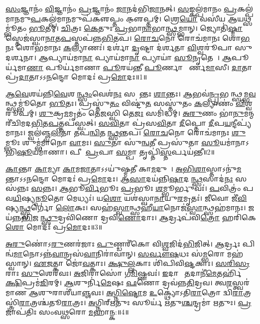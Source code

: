 \setcounter{anuvakam}{0}

   \ul{𑌸𑌂}𑌜𑍍𑌞𑌾𑌨𑌂॑ \ul{𑌵𑌿}𑌜𑍍𑌞𑌾𑌨𑌂॑ \ul{𑌪𑍍𑌰}𑌜𑍍𑌞𑌾𑌨𑌂॑ \ul{𑌜𑌾}𑌨𑌦॑𑌭𑌿\ul{𑌜𑌾}𑌨𑌤𑍍।
   \ul{𑌸}𑌙𑍍𑌕𑌲𑍍𑌪॑𑌮𑌾𑌨𑌂 \ul{𑌪𑍍𑌰}𑌕𑌲𑍍𑌪॑𑌮𑌾𑌨𑌮𑍁\ul{𑌪}\-𑌕𑌲𑍍𑌪॑𑌮𑌾\ul{𑌨}𑌮𑍁𑌪॑𑌕𑍢𑌪𑍍𑌤𑌂 𑌕𑍢॒𑌪𑍍𑌤𑌮𑍍।
   𑌶𑍍𑌰𑍇\ul{𑌯𑍋} 𑌵𑌸𑍀॑𑌯 \ul{𑌆}𑌯𑌥𑍍𑌸𑌮𑍍𑌭𑍂॑𑌤𑌂 \ul{𑌭𑍂}𑌤𑌮𑍍।
   \ul{𑌚𑌿}𑌤𑍍𑌰𑌃 \ul{𑌕𑍇}𑌤𑍁𑌃 \ul{𑌪𑍍𑌰}𑌭𑌾\ul{𑌨𑌾}𑌭𑌾\ul{𑌨𑍍𑌥𑍍𑌸}𑌮𑍍𑌭𑌾𑌨𑍍।
   𑌜𑍍𑌯𑍋𑌤𑌿॑\ul{𑌷𑍍𑌮𑌾}\ul{}𑌸𑍍𑌤𑍇𑌜॑𑌸𑍍𑌵𑌾\ul{𑌨𑌾}𑌤\ul{𑌪}\ul{}𑌸𑍍𑌤𑌪॑𑌨𑍍𑌨\ul{𑌭𑌿}\-𑌤𑌪\sn{}।
   \ul{𑌰𑍋}\ul{𑌚}𑌨𑍋 𑌰𑍋𑌚॑𑌮𑌾𑌨𑌃 𑌶𑍋\ul{𑌭}𑌨𑌃 𑌶𑍋𑌭॑𑌮𑌾𑌨𑌃 \ul{𑌕}𑌲𑍍𑌯𑌾𑌣𑌃॑।
   𑌦𑌰𑍍\mbox{}𑌶𑌾॑ \ul{𑌦𑍃}𑌷𑍍𑌟𑌾 𑌦॑𑌰𑍍\mbox{}\ul{𑌶}𑌤𑌾 \ul{𑌵𑌿}𑌶𑍍𑌵𑌰𑍂॑𑌪𑌾 𑌸𑍁𑌦𑌰𑍍\mbox{}\ul{𑌶}𑌨𑌾।
   \ul{𑌆}𑌪𑍍𑌯𑌾𑌯॑𑌮𑌾\ul{𑌨𑌾} 𑌪𑍍𑌯𑌾𑌯॑𑌮𑌾\ul{𑌨𑌾} 𑌪𑍍𑌯𑌾𑌯𑌾॑ \ul{𑌸𑍂}𑌨𑍃𑌤𑍇𑌰𑌾᳚।
   \ul{𑌆}𑌪𑍂𑌰𑍍𑌯॑𑌮𑌾\ul{𑌣𑌾} 𑌪𑍂𑌰𑍍𑌯॑𑌮𑌾𑌣𑌾 \ul{𑌪𑍂}𑌰𑌯॑𑌨𑍍𑌤𑍀 \ul{𑌪𑍂}𑌰𑍍𑌣𑌾 𑌪𑍗᳚𑌰𑍍𑌣\ul{𑌮𑌾}𑌸𑍀।
   \ul{𑌦𑌾}𑌤𑌾 𑌪𑍍𑌰॑\ul{𑌦𑌾}𑌤𑌾𑌽𑌽\ul{𑌨}𑌨𑍍𑌦𑍋 𑌮𑍋𑌦𑌃॑ 𑌪𑍍𑌰\ul{𑌮𑍋}𑌦𑌃॥1॥

   \ul{𑌆}\ul{𑌵𑍇}𑌶𑌯॑𑌨𑍍𑌨𑌿\ul{𑌵𑍇}𑌶𑌯᳚\ul{𑌨𑍍𑌥𑍍𑌸𑌂}𑌵𑍇𑌶॑\ul{𑌨𑌃} 𑌸𑌶𑌾᳚𑌨𑍍𑌤𑌃 \ul{𑌶𑌾}𑌨𑍍𑌤𑌃।
   \ul{𑌆}𑌭𑌵॑\ul{𑌨𑍍𑌪𑍍𑌰}\-𑌭𑌵᳚𑌨𑍍𑌥𑍍\-\ul{𑌸}𑌮𑍍𑌭\ul{𑌵}𑌨𑍍𑌥𑍍𑌸𑌮𑍍𑌭𑍂॑𑌤𑍋 \ul{𑌭𑍂}𑌤𑌃।
   𑌪𑍍𑌰𑌸𑍍𑌤𑍁॑\ul{𑌤𑌂} 𑌵𑌿𑌷𑍍𑌟𑍁॑\ul{𑌤}\ul{} 𑌸𑌸𑍍𑌤𑍁॑𑌤𑌂 \ul{𑌕}𑌲𑍍𑌯𑌾𑌣𑌂॑ \ul{𑌵𑌿}𑌶𑍍𑌵𑌰𑍂॑𑌪𑌮𑍍।
   \ul{𑌶𑍁}𑌕𑍍𑌰\ul{𑌮}𑌮𑍃𑌤𑌂॑ 𑌤𑍇\ul{𑌜}𑌸𑍍𑌵𑌿 𑌤𑍇\ul{𑌜𑌃} 𑌸𑌮𑌿॑𑌦𑍍𑌧𑌮𑍍।
   \ul{𑌅}\ul{𑌰𑍁}𑌣𑌂 𑌭𑌾॑\ul{𑌨𑍁}𑌮𑌨𑍍𑌮𑌰𑍀॑𑌚𑌿𑌮𑌦\ul{𑌭𑌿}𑌤\ul{𑌪}𑌤𑍍𑌤𑌪॑𑌸𑍍𑌵𑌤𑍍।
   \ul{𑌸}\ul{𑌵𑌿}𑌤𑌾 𑌪𑍍𑌰॑𑌸\ul{𑌵𑌿}𑌤𑌾 \ul{𑌦𑍀}𑌪𑍍𑌤𑍋 \ul{𑌦𑍀}𑌪\ul{𑌯}𑌨𑍍𑌦𑍀𑌪𑍍𑌯॑𑌮𑌾𑌨𑌃।
   𑌜𑍍𑌵𑌲॑𑌞𑍍𑌜𑍍𑌵\ul{𑌲𑌿}𑌤𑌾 𑌤𑌪॑\ul{𑌨𑍍𑌵𑌿}𑌤𑌪᳚\ul{𑌨𑍍𑌥𑍍𑌸}𑌨𑍍𑌤𑌪\sn{}।
   \ul{𑌰𑍋}\ul{𑌚}𑌨𑍋 𑌰𑍋𑌚॑𑌮𑌾𑌨𑌃 \ul{𑌶𑍁}𑌮𑍍𑌭𑍂𑌃 𑌶𑍁𑌮𑍍𑌭॑𑌮𑌾𑌨𑍋 \ul{𑌵𑌾}𑌮𑌃।
   \ul{𑌸𑍁}𑌤𑌾 𑌸𑍁॑\ul{𑌨𑍍𑌵}𑌤𑍀 𑌪𑍍𑌰𑌸𑍁॑𑌤𑌾 \ul{𑌸𑍂}𑌯𑌮𑌾॑𑌨𑌾𑌽𑌭𑌿\ul{𑌷𑍂}𑌯𑌮𑌾॑𑌣𑌾।
   𑌪𑍀𑌤𑍀᳚ \ul{𑌪𑍍𑌰}𑌪𑌾 \ul{𑌸}𑌮𑍍𑌪𑌾 𑌤𑍃𑌪𑍍𑌤𑌿॑\ul{𑌸𑍍𑌤}𑌰𑍍𑌪𑌯॑𑌨𑍍𑌤𑍀॥2॥

   \ul{𑌕𑌾}𑌨𑍍𑌤𑌾 \ul{𑌕𑌾}𑌮𑍍𑌯𑌾 \ul{𑌕𑌾}𑌮\ul{𑌜𑌾}𑌤𑌾𑌽𑌽𑌯𑍁॑𑌷𑍍𑌮𑌤𑍀 𑌕𑌾\ul{𑌮}𑌦𑍁𑌘𑌾᳚।
   \ul{𑌅}\ul{𑌭𑌿}\ul{𑌶𑌾}𑌸𑍍𑌤𑌾𑌽\-𑌨𑍁॑\ul{𑌮}𑌨𑍍𑌤𑌾𑌽𑌽\ul{𑌨}𑌨𑍍𑌦𑍋 𑌮𑍋𑌦𑌃॑ 𑌪𑍍𑌰\ul{𑌮𑍋}𑌦𑌃।
   \ul{𑌆}\ul{𑌸𑌾}𑌦𑌯॑𑌨𑍍𑌨𑌿\ul{𑌷𑌾}\-𑌦𑌯᳚\ul{𑌨𑍍𑌥𑍍𑌸}\ul{}𑌸𑌾𑌦॑\ul{𑌨𑌃} 𑌸𑌸॑𑌨𑍍𑌨𑌃 \ul{𑌸}𑌨𑍍𑌨𑌃।
   \ul{𑌆}𑌭𑍂\ul{𑌰𑍍𑌵𑌿}𑌭𑍂𑌃 \ul{𑌪𑍍𑌰}𑌭𑍂𑌃 \ul{𑌶}𑌮𑍍𑌭𑍂𑌰𑍍𑌭𑍁𑌵𑌃॑।
   \ul{𑌪}𑌵𑌿𑌤𑍍𑌰𑌂॑ 𑌪𑌵\ul{𑌯𑌿}𑌷𑍍𑌯\ul{𑌨𑍍𑌪𑍂}𑌤𑍋 𑌮𑍇𑌧𑍍𑌯𑌃॑।
   𑌯\ul{𑌶𑍋} 𑌯𑌶॑𑌸𑍍𑌵𑌾\ul{𑌨𑌾}𑌯𑍁\ul{𑌰}𑌮𑍃𑌤𑌃॑।
   \ul{𑌜𑍀}𑌵𑍋 𑌜𑍀॑\ul{𑌵𑌿}𑌷𑍍𑌯\ul{𑌨𑍍𑌥𑍍𑌸𑍍𑌵}𑌰𑍍𑌗𑍋 \ul{𑌲𑍋}𑌕𑌃।
   𑌸𑌹॑\ul{𑌸𑍍𑌵𑌾}𑌨𑍍𑌥𑍍𑌸𑌹𑍀॑\ul{𑌯𑌾}𑌨𑍋𑌜॑\ul{𑌸𑍍𑌵𑌾}𑌨𑍍𑌥𑍍𑌸𑌹॑𑌮𑌾𑌨𑌃।
   𑌜𑌯॑𑌨𑍍𑌨\ul{𑌭𑌿}𑌜𑌯᳚\ul{𑌨𑍍𑌥𑍍𑌸𑍁}\-𑌦𑍍𑌰𑌵𑌿॑𑌣𑍋 𑌦𑍍𑌰𑌵𑌿\ul{𑌣𑍋}𑌦𑌾𑌃।
   \ul{𑌆}𑌰𑍍𑌦𑍍𑌰𑌪॑𑌵𑌿\ul{𑌤𑍍𑌰𑍋} 𑌹𑌰𑌿॑𑌕𑍇\ul{𑌶𑍋} 𑌮𑍋𑌦𑌃॑ 𑌪𑍍𑌰\ul{𑌮𑍋}𑌦𑌃॥3॥

   \ul{𑌅}\ul{𑌰𑍁}𑌣𑍋॑𑌽\ul{𑌰𑍁}𑌣𑌰॑𑌜𑌾𑌃 \ul{𑌪𑍁}𑌣𑍍𑌡𑌰𑍀॑𑌕𑍋 𑌵𑌿\ul{𑌶𑍍𑌵}𑌜𑌿𑌦॑\ul{𑌭𑌿}𑌜𑌿𑌤𑍍।
   \ul{𑌆}𑌰𑍍𑌦𑍍𑌰𑌃 𑌪𑌿𑌨𑍍𑌵॑\ul{𑌮𑌾}𑌨𑍋𑌽𑌨𑍍𑌨॑\ul{𑌵𑌾}𑌨𑍍𑌰𑌸॑\ul{𑌵𑌾}𑌨𑌿𑌰𑌾॑𑌵𑌾𑌨𑍍।
   \ul{𑌸}\ul{𑌰𑍍𑌵𑍗}\ul{𑌷}𑌧𑌃 𑌸॑\ul{𑌮𑍍𑌭}𑌰𑍋 𑌮𑌹॑𑌸𑍍𑌵𑌾𑌨𑍍।
   \ul{𑌏}\ul{𑌜}𑌤𑍍𑌕𑌾 𑌜𑍋॑\ul{𑌵}𑌤𑍍𑌕𑌾𑌃।
   \ul{𑌕𑍍𑌷𑍁}\ul{𑌲𑍍𑌲}𑌕𑌾𑌃 𑌶𑌿॑𑌪𑌿𑌵𑌿\ul{𑌷𑍍𑌟}𑌕𑌾𑌃।
   \ul{𑌸}\ul{𑌰𑌿}\ul{𑌸𑍍𑌰}𑌰𑌾𑌃 \ul{𑌸𑍁}𑌶𑍇𑌰॑𑌵𑌃।
   \ul{𑌅}𑌜𑌿𑌰𑌾𑌸𑍋॑ 𑌗\ul{𑌮𑌿}𑌷𑍍𑌣𑌵𑌃॑।
   \ul{𑌇}𑌦𑌾𑌨𑍀𑌂᳚ \ul{𑌤}𑌦𑌾𑌨𑍀॑\ul{𑌮𑍇}𑌤𑌰𑍍\-\mbox{𑌹𑌿॑} \ul{𑌕𑍍𑌷𑌿}𑌪𑍍𑌰𑌮॑\ul{𑌜𑌿}𑌰𑌮𑍍।
   \ul{𑌆}𑌶𑍁𑌰𑍍𑌨𑌿॑\ul{𑌮𑍇}𑌷𑌃 \ul{𑌫}𑌣𑍋 𑌦𑍍𑌰𑌵॑𑌨𑍍𑌨\ul{𑌤𑌿}𑌦𑍍𑌰𑌵।
   𑌤𑍍𑌵\ul{𑌰}\ul{}𑌸𑍍𑌤𑍍𑌵𑌰॑𑌮𑌾𑌣 \ul{𑌆}𑌶𑍁𑌰𑌾𑌶𑍀॑𑌯𑌾\ul{𑌞𑍍𑌜}𑌵𑌃।
   \ul{𑌅}\ul{𑌗𑍍𑌨𑌿}\ul{𑌷𑍍𑌟𑍋}𑌮 \ul{𑌉}𑌕𑍍𑌥𑍍𑌯𑍋॑𑌽𑌤𑌿\ul{𑌰𑌾}𑌤𑍍𑌰𑍋 𑌦𑍍𑌵𑌿॑\ul{𑌰𑌾}𑌤𑍍𑌰𑌸𑍍𑌤𑍍𑌰𑌿॑\ul{𑌰𑌾}𑌤𑍍𑌰𑌶𑍍𑌚॑𑌤𑍂\ul{𑌰𑌾}𑌤𑍍𑌰𑌃।
   \ul{𑌅}𑌗𑍍𑌨𑌿𑌰𑍍{‌}\ul{𑌋}𑌤𑍁𑌃 𑌸𑍂𑌰𑍍𑌯॑ \ul{𑌋}𑌤𑍁\ul{𑌶𑍍𑌚}𑌨𑍍𑌦𑍍𑌰𑌮𑌾॑ \ul{𑌋}𑌤𑍁𑌃।
   \ul{𑌪𑍍𑌰}𑌜𑌾𑌪॑𑌤𑌿𑌃 𑌸𑌂𑌵\ul{𑌥𑍍𑌸}𑌰𑍋 \ul{𑌮}𑌹𑌾𑌨𑍍𑌕:॥4॥
   \anuvakamend
   
